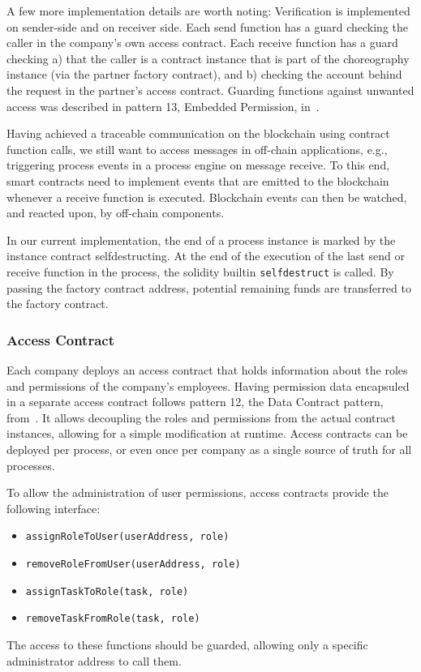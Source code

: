 \documentclass[runningheads]{llncs}
\begin{document}
A few more implementation details are worth noting:
Verification is implemented on sender-side and on receiver side.
Each send function has a guard checking the caller in the company's own access contract.
Each receive function has a guard checking a) that the caller is a contract instance that is part of the choreography instance (via the partner factory contract), and b) checking the account behind the request in the partner's access contract.
Guarding functions against unwanted access was described in pattern 13, Embedded Permission, in~\cite{xu2018pattern}.

Having achieved a traceable communication on the blockchain using contract function calls, we still want to access messages in off-chain applications, e.g., triggering process events in a process engine on message receive.
To this end, smart contracts need to implement events that are emitted to the blockchain whenever a receive function is executed.
Blockchain events can then be watched, and reacted upon, by off-chain components.

In our current implementation, the end of a process instance is marked by the instance contract selfdestructing.
At the end of the execution of the last send or receive function in the process, the solidity builtin \texttt{selfdestruct} is called.
By passing the factory contract address, potential remaining funds are transferred to the factory contract.

\subsubsection{Access Contract}

Each company deploys an access contract that holds information about the roles and permissions of the company's employees.
Having permission data encapsuled in a separate access contract follows pattern 12, the Data Contract pattern, from~\cite{xu2018pattern}.
It allows decoupling the roles and permissions from the actual contract instances, allowing for a simple modification at runtime.
Access contracts can be deployed per process, or even once per company as a single source of truth for all processes.

To allow the administration of user permissions, access contracts provide the following interface:
\begin{itemize}
	\item \texttt{assignRoleToUser(userAddress, role)}
	\item \texttt{removeRoleFromUser(userAddress, role)}
	\item \texttt{assignTaskToRole(task, role)}
	\item \texttt{removeTaskFromRole(task, role)}
\end{itemize}
The access to these functions should be guarded, allowing only a specific administrator address to call them.
\end{document}
